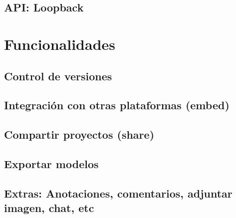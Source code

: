 \subsection{API: Loopback}

\section{Funcionalidades}

\subsection{Control de versiones}

\subsection{Integración con otras plataformas (embed)}

\subsection{Compartir proyectos (share)}

\subsection{Exportar modelos}

\subsection{Extras: Anotaciones, comentarios, adjuntar imagen, chat, etc}
